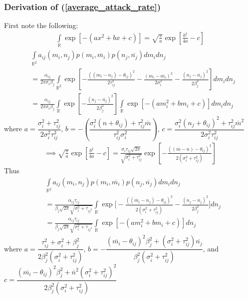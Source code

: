 \documentclass{amsart}
\theoremstyle{definition}
\theoremstyle{remark}
\numberwithin{equation}{section}
\begin{document}
\subsubsection{Derivation of (\ref{average_attack_rate})}
First note the following:
\begin{align*}
	\int\limits_{\mathbb{R}}\exp\left[-(ax^2 + bx + c)\right] = \sqrt{\frac{\pi}{a}}\exp\left[\frac{b^2}{4a} - c\right]
\end{align*}
\begin{align*}
	&\int\limits_{\mathbb{R}^2}a_{ij}(m_i, n_j)p(m_i, \overline{m_i})p(n_j, \overline{n_j})dm_idn_j \\
	&= \frac{\alpha_{ij}}{2\pi\sigma_i\beta_j}\int\limits_{\mathbb{R}^2}\exp\left[-\frac{((m_i - n_j) - \theta_{ij})^2}{2\tau_{ij}^2} - \frac{(m_i - \overline{m_i})^2}{2\sigma_i^2} - \frac{(n_j - \overline{n_j})^2}{2\beta_j^2}\right]dm_idn_j \\
	&= \frac{\alpha_{ij}}{2\pi\sigma_i\beta_j}\int\limits_{\mathbb{R}}\exp\left[-\frac{(n_j - \overline{n_j})^2}{2\beta_j^2}\right]\int\limits_{\mathbb{R}}\exp\left[-(am_i^2 + bm_i + c)\right]dm_idn_j
\end{align*}
where $a = \dfrac{\sigma_i^2 + \tau_{ij}^2}{2\sigma_i^2\tau_{ij}^2}$, $b = -\left(\dfrac{\sigma_i^2(n + \theta_{ij}) + \tau_{ij}^2\overline{m}}{\tau_{ij}^2\sigma_i^2}\right)$, $c = \dfrac{\sigma_i^2(n_j + \theta_{ij})^2 + \tau_{ij}^2\overline{m}^2}{2\sigma_i^2\tau_{ij}^2}$
\begin{align*}
	\implies \sqrt{\frac{\pi}{a}}\exp\left[\frac{b^2}{4a} - c\right] = \frac{\sigma_i\tau_{ij}\sqrt{2\pi}}{\sqrt{\sigma_i^2 + \tau_{ij}^2}}\exp\left[-\frac{((\overline{m} - n) - \theta_{ij})^2}{2(\sigma_i^2 + \tau_{ij}^2)}\right]
\end{align*}
Thus
\begin{align*}
	&\int\limits_{\mathbb{R}^2}a_{ij}(m_i, n_j)p(m_i, \overline{m_i})p(n_j, \overline{n_j})dm_idn_j \\
	&= \frac{\alpha_{ij}\tau_{ij}}{\beta_j\sqrt{2\pi}\sqrt{\sigma_i^2 + \tau_{ij^2}}}\int\limits_{\mathbb{R}}\exp\Bigg[-\frac{((\overline{m_i} - n_j) - \theta_{ij})^2}{2(\sigma_i^2 + \tau_{ij}^2)} - \frac{(n_j - \overline{n_j})^2}{2\beta_j^2}\Bigg]dn_j \\
	&= \frac{\alpha_{ij}\tau_{ij}}{\beta_j\sqrt{2\pi}\sqrt{\sigma_i^2 + \tau_{ij^2}}}\int\limits_{\mathbb{R}}\exp\left[-(am_i^2 + bm_i + c)\right]dn_j
\end{align*}
where $a = \dfrac{\tau_{ij}^2 + \sigma_i^2 + \beta_j^2}{2\beta_j^2(\sigma_i^2 + \tau_{ij}^2)}$, $b = -\dfrac{(\overline{m_i} - \theta_{ij})^2\beta_j^2 + (\sigma_i^2 + \tau_{ij}^2)\overline{n_j}}{\beta_j^2(\sigma_i^2 + \tau_{ij}^2)}$, and $c = \dfrac{(\overline{m_i} - \theta_{ij})^2\beta_j^2 + \overline{n}^2(\sigma_i^2 + \tau_{ij}^2)^2}{2\beta_j^2(\sigma_i^2 + \tau_{ij}^2)}$
\end{document}
